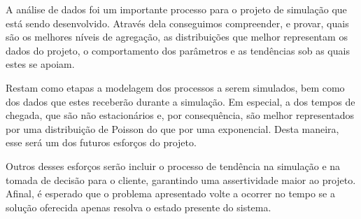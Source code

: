 A análise de dados foi um importante processo para o projeto de simulação que está sendo desenvolvido. Através dela conseguimos compreender, e provar, quais são os melhores níveis de agregação, as distribuições que melhor representam os dados do projeto, o comportamento dos parâmetros e as tendências sob as quais estes se apoiam.

Restam como etapas a modelagem dos processos a serem simulados, bem como dos dados que estes receberão durante a simulação. Em especial, a dos tempos de chegada, que são não estacionários e, por consequência, são melhor representados por uma distribuição de Poisson do que por uma exponencial. Desta maneira, esse será um dos futuros esforços do projeto.

Outros desses esforços serão incluir o processo de tendência na simulação e na tomada de decisão para o cliente, garantindo uma assertividade maior ao projeto. Afinal, é esperado que o problema apresentado volte a ocorrer no tempo se a solução oferecida apenas resolva o estado presente do sistema.